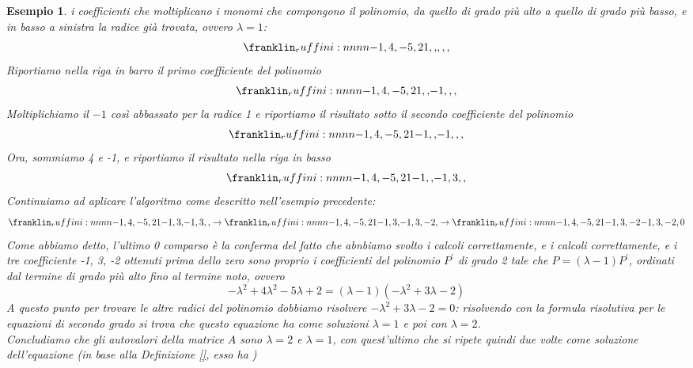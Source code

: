 \documentclass{book}
\newtheorem{esempio}{Esempio}[section]
\begin{document}
\begin{esempio}
 i coefficienti che moltiplicano i monomi che compongono il polinomio, da quello di grado più alto a quello di
 grado più basso, e in basso a sinistra la radice già trovata, ovvero $\lambda=1$:
 \begin{equation*}
  \ruffini{-1,4,-5,2}{1}{,,}{,,,} 
 \end{equation*}
 Riportiamo nella riga in barro il primo coefficiente del polinomio
 \begin{equation*}
   \ruffini{-1,4,-5,2}{1}{,,}{-1,,,} 
 \end{equation*}
 Moltiplichiamo il $-1$ così abbassato per la radice 1 e riportiamo il risultato sotto il secondo coefficiente del
 polinomio
 \begin{equation*}
   \ruffini{-1,4,-5,2}{1}{-1,,}{-1,,,} 
 \end{equation*}
 Ora, sommiamo 4 e -1, e riportiamo il risultato nella riga in basso
 \begin{equation*}
   \ruffini{-1,4,-5,2}{1}{-1,,}{-1,3,,} 
 \end{equation*}
 Continuiamo ad aplicare l'algoritmo come descritto nell'esempio precedente:
 \begin{equation*}
   \ruffini{-1,4,-5,2}{1}{-1,3,}{-1,3,,} \to \ruffini{-1,4,-5,2}{1}{-1,3,}{-1,3,-2,}\to  \ruffini{-1,4,-5,2}{1}{-1,3,-2}{-1,3,-2,0}
 \end{equation*}
 Come abbiamo detto, l'ultimo 0 comparso è la conferma del fatto che abnbiamo svolto i calcoli correttamente, e i
 calcoli correttamente, e i tre coefficiente -1, 3, -2 ottenuti prima dello zero sono proprio i coefficienti del
 polinomio $P^\prime$ di grado 2 tale che $P=(\lambda-1)P^\prime$, ordinati dal termine di grado più alto fino al
 termine noto, ovvero
 \begin{equation*}
   -\lambda^2+4\lambda^2-5\lambda+2=(\lambda-1)(-\lambda^2+3\lambda-2)
 \end{equation*}
 A questo punto per trovare le altre radici del polinomio dobbiamo risolvere $-\lambda^2+3\lambda-2=0$: risolvendo
 con la formula risolutiva per le equazioni di secondo grado si trova che questo equazione ha come soluzioni
 $\lambda=1$ e poi con $\lambda=2$.\\
 Concludiamo che gli autovalori della matrice $A$ sono $\lambda=2$ e $\lambda=1$, con quest'ultimo che si ripete
 quindi due volte come soluzione dell'equazione (in base alla Definizione \ref{}, esso ha )
\end{esempio}
\end{document}
